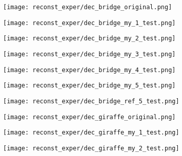 \begin{figure}[H]
	\centering
	\begin{subfigure}[b]{0.13\linewidth}
		\texttt{[image: reconst\_exper/dec\_bridge\_original.png]} %
	\end{subfigure}
	\begin{subfigure}[b]{0.13\linewidth}
		\texttt{[image: reconst\_exper/dec\_bridge\_my\_1\_test.png]} %
	\end{subfigure}
	\begin{subfigure}[b]{0.13\linewidth}
		\texttt{[image: reconst\_exper/dec\_bridge\_my\_2\_test.png]} %
	\end{subfigure}
	\begin{subfigure}[b]{0.13\linewidth}
		\texttt{[image: reconst\_exper/dec\_bridge\_my\_3\_test.png]} %
	\end{subfigure}
	\begin{subfigure}[b]{0.13\linewidth}
		\texttt{[image: reconst\_exper/dec\_bridge\_my\_4\_test.png]} %
	\end{subfigure}
	\begin{subfigure}[b]{0.13\linewidth}
		\texttt{[image: reconst\_exper/dec\_bridge\_my\_5\_test.png]} %
	\end{subfigure}
	\begin{subfigure}[b]{0.13\linewidth}
		\texttt{[image: reconst\_exper/dec\_bridge\_ref\_5\_test.png]} %
	\end{subfigure}
	\centering
	\begin{subfigure}[b]{0.13\linewidth}
		\texttt{[image: reconst\_exper/dec\_giraffe\_original.png]} %
	\end{subfigure}
	\begin{subfigure}[b]{0.13\linewidth}
		\texttt{[image: reconst\_exper/dec\_giraffe\_my\_1\_test.png]} %
	\end{subfigure}
	\begin{subfigure}[b]{0.13\linewidth}
		\texttt{[image: reconst\_exper/dec\_giraffe\_my\_2\_test.png]} %
	\end{subfigure}
	\begin{subfigure}[b]{0.13\linewidth}

\end{subfigure}
\end{figure}
